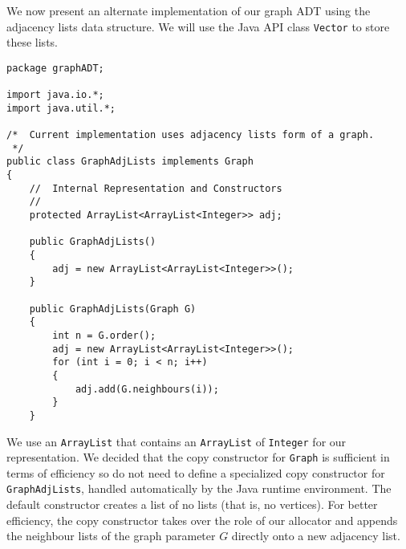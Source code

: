 We now present an alternate implementation of our graph ADT using
the adjacency lists data structure.   We will use the Java API
class \verb|Vector| to store these lists.

{\renewcommand{\ttdefault}{pcr} %
\footnotesize \begin{verbatim}
package graphADT;

import java.io.*;
import java.util.*;

/*  Current implementation uses adjacency lists form of a graph.
 */
public class GraphAdjLists implements Graph
{
    //  Internal Representation and Constructors
    //
    protected ArrayList<ArrayList<Integer>> adj;

    public GraphAdjLists()
    {
        adj = new ArrayList<ArrayList<Integer>>();
    }

    public GraphAdjLists(Graph G)
    {
        int n = G.order();
        adj = new ArrayList<ArrayList<Integer>>();
        for (int i = 0; i < n; i++)
        {
            adj.add(G.neighbours(i));
        }
    }
\end{verbatim}%
}

We use an \verb|ArrayList| that contains an \verb|ArrayList| of
\verb|Integer| for our representation. We decided that the copy
constructor for \verb|Graph| is sufficient in terms of efficiency so do
not need to define a specialized copy constructor for
\verb|GraphAdjLists|, handled automatically by the Java runtime
environment.
The default constructor creates a list of no lists (that is, no vertices).
For better efficiency, the copy constructor takes over the role of our
allocator and appends the neighbour lists of the graph parameter $G$
directly onto a new adjacency list.



